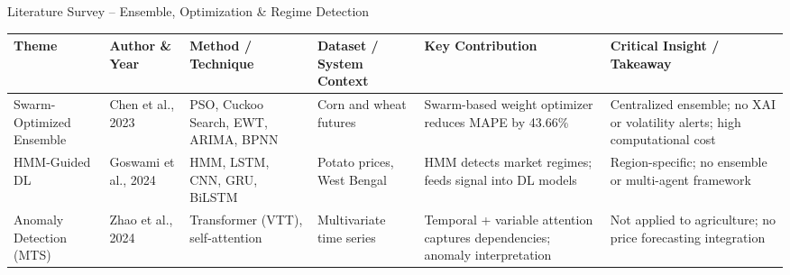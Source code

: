 \documentclass{beamer}
\begin{document}
\begin{frame}[label=lit_ens]{Literature Survey -- Ensemble, Optimization \& Regime Detection}
\setlength{\tabcolsep}{2pt}
\renewcommand{\arraystretch}{1.3}
\tiny

\begin{tcolorbox}[enhanced, colback=white, colframe=accentpurple!40, arc=4pt, boxrule=0.3pt,
  left=1pt, right=1pt, top=2pt, bottom=2pt, shadow={1pt}{-1pt}{0pt}{black!10}]
\begin{adjustbox}{max width=\textwidth}
\begin{tabular}{|L{1.5cm}|L{1.4cm}|L{1.6cm}|L{1.8cm}|L{2.0cm}|L{2.3cm}|}
\hline
{}
\textbf{Theme} & \textbf{Author \& Year} & \textbf{Method / Technique} & \textbf{Dataset / System Context} & \textbf{Key Contribution} & \textbf{Critical Insight / Takeaway} \\
\hline
Swarm-Optimized Ensemble & Chen et al., 2023 & PSO, Cuckoo Search, EWT, ARIMA, BPNN & Corn and wheat futures & Swarm-based weight optimizer reduces MAPE by 43.66\% & Centralized ensemble; no XAI or volatility alerts; high computational cost \\ \hline
HMM-Guided DL & Goswami et al., 2024 & HMM, LSTM, CNN, GRU, BiLSTM & Potato prices, West Bengal & HMM detects market regimes; feeds signal into DL models & Region-specific; no ensemble or multi-agent framework \\ \hline
Anomaly Detection (MTS) & Zhao et al., 2024 & Transformer (VTT), self-attention & Multivariate time series & Temporal + variable attention captures dependencies; anomaly interpretation & Not applied to agriculture; no price forecasting integration \\ \hline
\end{tabular}
\end{adjustbox}
\end{tcolorbox}

\end{frame}
\end{document}

